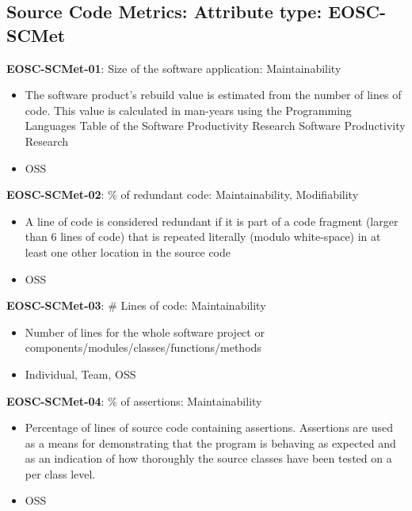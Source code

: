 \subsection{Source Code Metrics: Attribute type: EOSC-SCMet}

\textbf{EOSC-SCMet-01}: Size of the software application: Maintainability

\begin{itemize}
    \item The software product's rebuild value is estimated from the number of lines of code. This value is calculated in man-years using the  Programming Languages Table of the Software Productivity Research Software Productivity Research \cite{baggen_standardized_2012}
    \item OSS
\end{itemize}

\textbf{EOSC-SCMet-02}: \% of redundant code: Maintainability, Modifiability

\begin{itemize}
    \item A line of code is considered redundant if it is part of a code fragment (larger than 6 lines of code) that is repeated literally (modulo  white-space) in at least one other location in the source code \cite{baggen_standardized_2012}
    \item OSS
\end{itemize}

\textbf{EOSC-SCMet-03}: \# Lines of code: Maintainability

\begin{itemize}
    \item Number of lines for the whole software project or components/modules/classes/functions/methods \cite{montagud_systematic_2012,baggen_standardized_2012}
    \item Individual, Team, OSS
\end{itemize}

\textbf{EOSC-SCMet-04}: \% of assertions: Maintainability

\begin{itemize}
    \item Percentage of lines of source code containing assertions. Assertions are used as a means for demonstrating that the program is behaving as expected and as an indication of how thoroughly the source classes have been tested on a per class level. \cite{nagappan_early_2005}
    \item OSS
\end{itemize}

